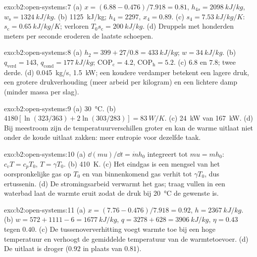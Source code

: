 \begin{solution}{exo:b2:open-systems:7}
(a) $x = (6.88 - 0.476)/7.918 = 0.81$, $h_{4s} = \qty{2098}{kJ/kg}$,
$w_{\text{s}} =
\qty{1324}{kJ/kg}$. (b) \qty{1125}{kJ/kg}; $h_4 = 2297$,
$x_4 = 0.89$. (c) $s_4 =
\qty{7.53}{kJ/kg/K}$:
$s_{\text{c}} = \qty{0.65}{kJ/kg/K}$; verloren
$T_0s_{\text{c}} =
\qty{200}{kJ/kg}$. (d) Druppels met honderden meters per
seconde eroderen de
laatste schoepen.
\end{solution}

\begin{solution}{exo:b2:open-systems:8}
(a) $h_2 = 399 + 27/0.8 = \qty{433}{kJ/kg}$; $w = \qty{34}{kJ/kg}$. (b)
$q_{\text{verd}}
= 143$, $q_{\text{cond}} = \qty{177}{kJ/kg}$;
$\mathrm{COP}_{\text{c}} = 4.2$,
$\mathrm{COP}_{\text{h}} = 5.2$. (c) $6.8$ en $7.8$; twee derde. (d)
\qty{0.045}{kg/s},
\qty{1.5}{kW}; een koudere verdamper betekent een lagere druk, een grotere
drukverhouding (meer arbeid per kilogram) en een lichtere damp (minder
massa per slag).
\end{solution}

\begin{solution}{exo:b2:open-systems:9}
(a) \qty{30}{\celsius}. (b) $4180[\ln(323/363) + 2\ln(303/283)] = \qty{83}{W/K}$.
(c) \qty{24}{kW} van \qty{167}{kW}. (d) Bij meestroom zijn de temperatuurverschillen
groter en kan de warme uitlaat niet onder de koude uitlaat zakken: meer
entropie voor dezelfde taak.
\end{solution}

\begin{solution}{exo:b2:open-systems:10}
(a) $\dd(mu)/\dd t = \dot m h_0$ integreert tot $mu = mh_0$: $c_vT = c_pT_0$,
$T = \gamma T_0$. (b) \qty{410}{K}. (c) Het eindgas is een mengsel van het
oorspronkelijke gas op $T_0$ en van binnenkomend gas verhit tot $\gamma T_0$, dus
ertussenin. (d) De stromingsarbeid verwarmt het gas; traag vullen in een
waterbad laat de warmte eruit zodat de druk bij \qty{20}{\celsius} de
gewenste is.
\end{solution}

\begin{solution}{exo:b2:open-systems:11}
(a) $x = (7.76 - 0.476)/7.918 = 0.92$, $h = \qty{2367}{kJ/kg}$. (b)
$w = 572 + 1111
- 6 = \qty{1677}{kJ/kg}$,
$q = 3278 + 628 = \qty{3906}{kJ/kg}$, $\eta = 0.43$
tegen $0.40$. (c) De tussenoververhitting voegt warmte toe bij een hoge
temperatuur en
verhoogt de gemiddelde temperatuur van de warmtetoevoer. (d) De uitlaat is droger
($0.92$ in plaats van $0.81$).
\end{solution}

